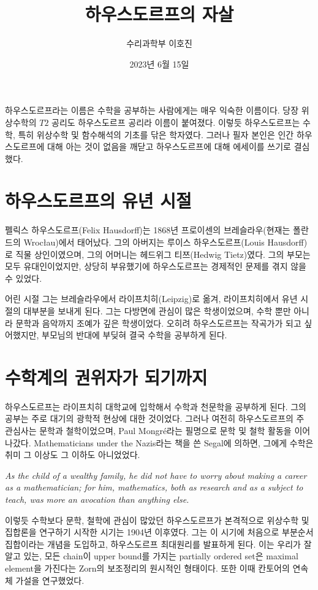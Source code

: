 \documentclass{article}
\title{하우스도르프의 자살}
\author{수리과학부 이호진}
\date{2023년 6월 15일}
\begin{document}
    \maketitle

    하우스도르프라는 이름은 수학을 공부하는 사람에게는 매우 익숙한 이름이다. 당장 위상수학의 $T2$ 공리도 하우스도르프 공리라 이름이 붙여졌다. 이렇듯 하우스도르프는 수학, 특히 위상수학 및 함수해석의 기초를 닦은 학자였다. 그러나 필자 본인은 인간 하우스도르프에 대해 아는 것이 없음을 깨닫고 하우스도르프에 대해 에세이를 쓰기로 결심했다.

    \section*{하우스도르프의 유년 시절}

    펠릭스 하우스도르프(Felix Hausdorff)는 1868년 프로이센의 브레슬라우(현재는 폴란드의 Wroc\l au)에서 태어났다. 그의 아버지는 루이스 하우스도르프(Louis Hausdorff)로 직물 상인이였으며, 그의 어머니는 헤드위그 티쯔(Hedwig Tietz)였다. 그의 부모는 모두 유대인이었지만, 상당히 부유했기에 하우스도르프는 경제적인 문제를 겪지 않을 수 있었다.

    어린 시절 그는 브레슬라우에서 라이프치히(Leipzig)로 옮겨, 라이프치히에서 유년 시절의 대부분을 보내게 된다. 그는 다방면에 관심이 많은 학생이었으며, 수학 뿐만 아니라 문학과 음악까지 조예가 깊은 학생이었다. 오히려 하우스도르프는 작곡가가 되고 싶어했지만, 부모님의 반대에 부딪혀 결국 수학을 공부하게 된다.

    \section*{수학계의 권위자가 되기까지}

    하우스도르프는 라이프치히 대학교에 입학해서 수학과 천문학을 공부하게 된다. 그의 공부는 주로 대기의 광학적 현상에 대한 것이었다. 그러나 여전히 하우스도르프의 주 관심사는 문학과 철학이었으며, Paul Mongr\'e라는 필명으로 문학 및 철학 활동을 이어 나갔다. Mathematicians under the Nazis라는 책을 쓴 Segal에 의하면, 그에게 수학은 취미 그 이상도 그 이하도 아니었었다.\begin{displayquote}
        \textit{As the child of a wealthy family, he did not have to worry about making a career as a mathematician; for him, mathematics, both as research and as a subject to teach, was more an avocation than anything else.}
    \end{displayquote}

    이렇듯 수학보다 문학, 철학에 관심이 많았던 하우스도르프가 본격적으로 위상수학 및 집합론을 연구하기 시작한 시기는 1904년 이후였다. 그는 이 시기에 처음으로 부분순서집합이라는 개념을 도입하고, 하우스도르프 최대원리를 발표하게 된다. 이는 우리가 잘 알고 있는, 모든 chain이 upper bound를 가지는 partially ordered set은 maximal element을 가진다는 Zorn의 보조정리의 원시적인 형태이다. 또한 이때 칸토어의 연속체 가설을 연구했었다.
\end{document}
